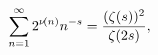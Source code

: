 \[\sum_{n=1}^{\infty}2^{\mathop{\nu\/}\nolimits\!\left(n\right)}n^{-s}=\frac{(%
\mathop{\zeta\/}\nolimits\!\left(s\right))^{2}}{\mathop{\zeta\/}\nolimits\!%
\left(2s\right)},\]